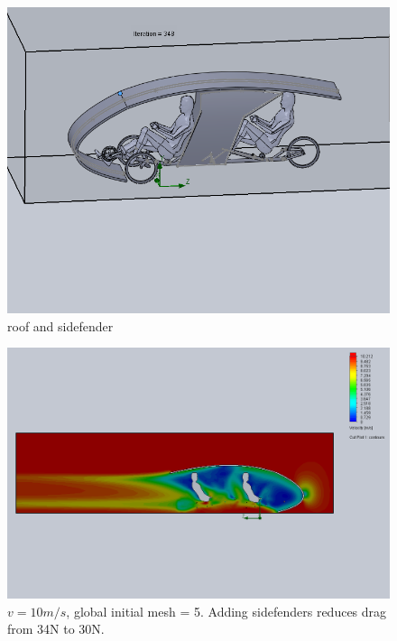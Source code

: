 \documentclass[11pt]{article}
\begin{document}
\begin{figure}[ht]
  \includegraphics[width=\textwidth]{roof2_sidefender.png}
  \caption{roof and sidefender}
\end{figure}

\begin{figure}[ht]
\includegraphics[width=\textwidth]{gm_5_rf_7_v10_roof2_sidefender.png}
\caption{$v = 10 m/s$, global initial mesh = 5. Adding sidefenders reduces drag from 34N to 30N.}
\end{figure}
\end{document}
